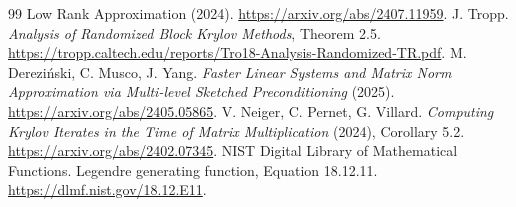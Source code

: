 \documentclass[11pt]{article}
\begin{document}
\begin{thebibliography}{99}
{Low Rank Approximation} (2024).
\url{https://arxiv.org/abs/2407.11959}.
 J. Tropp. \emph{Analysis of Randomized Block Krylov Methods},
Theorem 2.5.
\url{https://tropp.caltech.edu/reports/Tro18-Analysis-Randomized-TR.pdf}.
 M. Derezi\'nski, C. Musco, J. Yang. \emph{Faster Linear
Systems and Matrix Norm Approximation via Multi-level Sketched Preconditioning}
(2025).
\url{https://arxiv.org/abs/2405.05865}.
 V. Neiger, C. Pernet, G. Villard.
\emph{Computing Krylov Iterates in the Time of Matrix Multiplication}
(2024), Corollary 5.2.
\url{https://arxiv.org/abs/2402.07345}.
 NIST Digital Library of Mathematical Functions.
Legendre generating function, Equation 18.12.11.
\url{https://dlmf.nist.gov/18.12.E11}.
\end{thebibliography}
\end{document}
